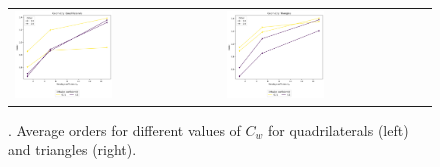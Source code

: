 \begin{figure}[h!]
	\centering
	\begin{tabular}{p{} p{}}
		\vspace{0pt} 
		\includegraphics[width=0.49\textwidth]{../figs/parametric/burgers_2D/orders_2_4}
		&
		\vspace{0pt} 
		\includegraphics[width=0.49\textwidth]{../figs/parametric/burgers_2D/orders_2_3}
	\end{tabular}
	\caption{. Average orders for different values of $C_w$ for 
	quadrilaterals (left) and triangles (right).}
	\label{fig:kucera_orders}
\end{figure}


